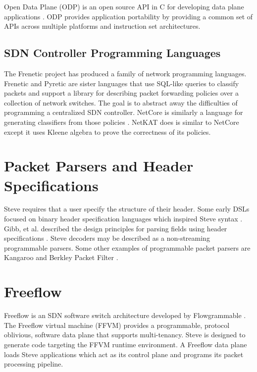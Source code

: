 Open Data Plane (ODP) is an open source API in C for developing data plane applications \cite{odp_webpage}. ODP provides application portability by providing a common set of APIs across multiple platforms and instruction set architectures.

\subsection{SDN Controller Programming Languages} \label{rel:frenetic}

The Frenetic project has produced a family of network programming
languages. Frenetic \cite{foster2011frenetic, foster2013frenetic} and Pyretic \cite{modularpyretic} are sister languages
that use SQL-like queries to classify packets and support a library for describing
packet forwarding policies over a collection of network switches. The goal is to
abstract away the difficulties of programming a centralized SDN controller.
NetCore is similarly a language for
generating classifiers from those policies \cite{monsanto2012netcore}. 
NetKAT does is similar to NetCore except it uses Kleene algebra \cite{kozen2014netkat, anderson2014netkat} to prove the correctness of its policies.

\section{Packet Parsers and Header Specifications}

Steve requires that a user specify the structure of their header.
Some early DSLs focused on binary header specification languages which inspired Steve syntax \cite{binpac, packet_types, datascript}.
Gibb, et al. described the design principles for parsing fields using header specifications
\cite{parser2013gibb}. Steve decoders may be described as a non-streaming programmable parsers. 
Some other examples of programmable packet parsers are Kangaroo \cite{kangaroo} and Berkley Packet Filter \cite{bpf1993mccanne}.

\section{Freeflow}
\label{rel:freeflow}

Freeflow is an SDN software switch architecture developed
by Flowgrammable \cite{freeflow_software}. The Freeflow virtual machine (FFVM) 
provides a programmable, protocol oblivious, software data plane that 
supports multi-tenancy. Steve is
designed to generate code targeting the FFVM runtime environment. A Freeflow data 
plane loads Steve applications which act as its control plane and programs its packet processing pipeline.

